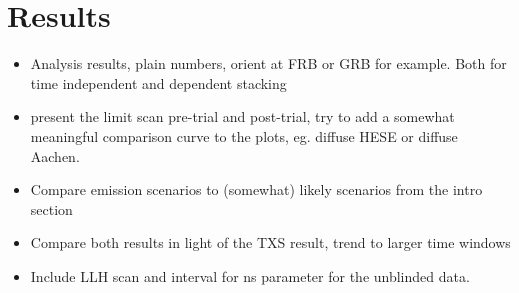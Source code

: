 \chapter{Results}

\begin{itemize}
  \item Analysis results, plain numbers, orient at FRB or GRB for example.
  Both for time independent and dependent stacking
  \item present the limit scan pre-trial and post-trial, try to add a somewhat meaningful comparison curve to the plots, eg. diffuse HESE or diffuse Aachen.
  \item Compare emission scenarios to (somewhat) likely scenarios from the intro section
  \item Compare both results in light of the TXS result, trend to larger time windows
  \item Include LLH scan and interval for ns parameter for the unblinded data.
\end{itemize}